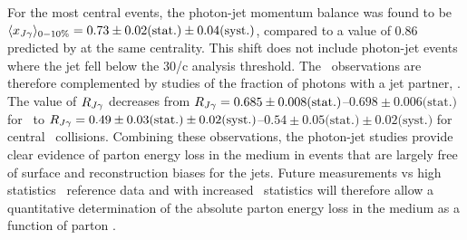 For the most central events, the  photon-jet momentum balance  was found to be
$\langle x_{J\gamma}\rangle_{0-10\%} = 0.73 \pm 0.02 \mbox{(stat.)} \pm 0.04 \mbox{(syst.)}$, compared
to a value of 0.86 predicted by \PYTHYD{} at the same centrality. This shift does
not include photon-jet events where the jet fell below the 30\GeV/c analysis threshold.
The \xjg\ observations are therefore complemented by studies of the fraction of
photons with a jet partner, \rjg.  The value of $R_{J\gamma}$ decreases
from $R_{J\gamma} = 0.685\pm 0.008\mbox{(stat.)}$--$0.698\pm 0.006\mbox{(stat.)}$ for \PYTHYD\
to  $R_{J\gamma} = 0.49\pm 0.03\mbox{(stat.)}\pm 0.02\mbox{(syst.)}$--$0.54\pm 0.05\mbox{(stat.)}\pm 0.02\mbox{(syst.)}$ for
central \PbPb\ collisions. Combining these observations, the photon-jet studies
provide clear evidence of parton energy loss in the medium in events that are
largely free of surface and reconstruction biases for the jets. Future measurements
vs high statistics \pp\ reference data and with increased \PbPb\ statistics will
therefore allow a quantitative determination of the absolute parton energy loss
in the medium as a function of parton \pT.

